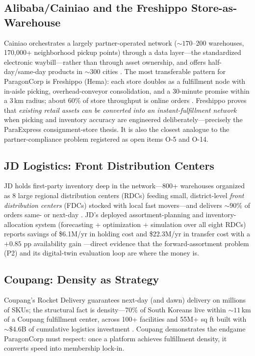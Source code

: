 \documentclass[10pt,twocolumn,letterpaper]{article}
\theoremstyle{definition}
\begin{document}
\subsection{Alibaba/Cainiao and the Freshippo Store-as-Warehouse}
Cainiao orchestrates a largely partner-operated network (${\sim}170$--200 warehouses, 170,000+ neighborhood pickup points) through a data layer---the standardized electronic waybill---rather than through asset ownership, and offers half-day/same-day products in ${\sim}300$ cities \cite{wirechina2024,scmp2023}. The most transferable pattern for ParagonCorp is Freshippo (Hema): each store doubles as a fulfillment node with in-aisle picking, overhead-conveyor consolidation, and a 30-minute promise within a 3\,km radius; about 60\% of store throughput is online orders \cite{vangaalen2022}. Freshippo proves that \emph{existing retail assets can be converted into an instant-fulfillment network} when picking and inventory accuracy are engineered deliberately---precisely the ParaExpress consignment-store thesis. It is also the closest analogue to the partner-compliance problem registered as open items O-5 and O-14.

\subsection{JD Logistics: Front Distribution Centers}
JD holds first-party inventory deep in the network---800+ warehouses organized as 8 large regional distribution centers (RDCs) feeding small, district-level \emph{front distribution centers} (FDCs) stocked with local fast movers---and delivers ${\sim}90\%$ of orders same- or next-day \cite{statista2024}. JD's deployed assortment-planning and inventory-allocation system (forecasting + optimization + simulation over all eight RDCs) reports savings of \$6.1M/yr in holding cost and \$22.3M/yr in transfer cost with a $+0.85$ pp availability gain \cite{wang2025}---direct evidence that the forward-assortment problem (P2) and its digital-twin evaluation loop are where the money is.

\subsection{Coupang: Density as Strategy}
Coupang's Rocket Delivery guarantees next-day (and dawn) delivery on millions of SKUs; the structural fact is density---70\% of South Koreans live within ${\sim}11$\,km of a Coupang fulfillment center, across 100+ facilities and 55M+ sq ft built with ${\sim}\$4.6$B of cumulative logistics investment \cite{goodwater2021,coupang2025}. Coupang demonstrates the endgame ParagonCorp must respect: once a platform achieves fulfillment density, it converts speed into membership lock-in.
\end{document}
